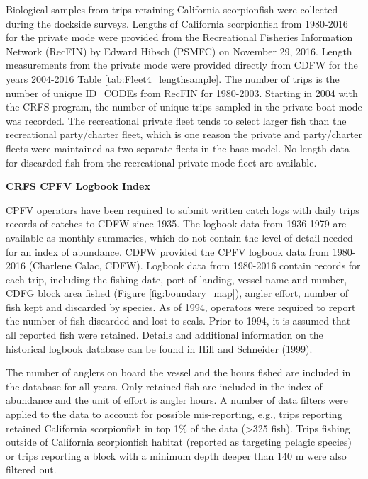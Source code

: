 \documentclass[12pt,]{article}
\begin{document}
Biological samples from trips retaining California scorpionfish were
collected during the dockside surveys. Lengths of California
scorpionfish from 1980-2016 for the private mode were provided from the
Recreational Fisheries Information Network (RecFIN) by Edward Hibsch
(PSMFC) on November 29, 2016. Length measurements from the private mode
were provided directly from CDFW for the years 2004-2016 Table
\ref{tab:Fleet4_lengthsample}. The number of trips is the number of
unique ID\_CODEs from RecFIN for 1980-2003. Starting in 2004 with the
CRFS program, the number of unique trips sampled in the private boat
mode was recorded. The recreational private fleet tends to select larger
fish than the recreational party/charter fleet, which is one reason the
private and party/charter fleets were maintained as two separate fleets
in the base model. No length data for discarded fish from the
recreational private mode fleet are available.

\textbf{CRFS CPFV Logbook Index}

CPFV operators have been required to submit written catch logs with
daily trips records of catches to CDFW since 1935. The logbook data from
1936-1979 are available as monthly summaries, which do not contain the
level of detail needed for an index of abundance. CDFW provided the CPFV
logbook data from 1980-2016 (Charlene Calac, CDFW). Logbook data from
1980-2016 contain records for each trip, including the fishing date,
port of landing, vessel name and number, CDFG block area fished (Figure
\ref{fig:boundary_map}), angler effort, number of fish kept and
discarded by species. As of 1994, operators were required to report the
number of fish discarded and lost to seals. Prior to 1994, it is assumed
that all reported fish were retained. Details and additional information
on the historical logbook database can be found in Hill and Schneider
(\protect\hyperlink{ref-Hill1999}{1999}).

The number of anglers on board the vessel and the hours fished are
included in the database for all years. Only retained fish are included
in the index of abundance and the unit of effort is angler hours. A
number of data filters were applied to the data to account for possible
mis-reporting, e.g., trips reporting retained California scorpionfish in
top 1\% of the data (\textgreater{}325 fish). Trips fishing outside of
California scorpionfish habitat (reported as targeting pelagic species)
or trips reporting a block with a minimum depth deeper than 140 m were
also filtered out.
\end{document}
